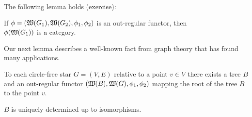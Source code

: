 The following lemma holds (exercise):

\begin{lemma}
If $\phi = (\mbox{$\mathfrak{W}(G_1)$}, \mbox{$\mathfrak{W}(G_2)$}, \phi_1, \phi_2)$ is an out-regular
functor, then \\ $\phi(\mbox{$\mathfrak{W}(G_1)$})$ is a category.
\end{lemma}

Our next lemma describes a well-known fact from graph theory that has found many
applications.

\begin{lemma}
To each circle-free star $G = (V, E)$ relative to a point $v \in V$ there exists
a tree $B$ and an out-regular functor $(\mbox{$\mathfrak{W}(B)$}, \mbox{$\mathfrak{W}(G)$},
\phi_1, \phi_2)$ mapping the root of the tree $B$ to the point $v$. 

$B$ is uniquely determined up to isomorphisms.
\end{lemma}
